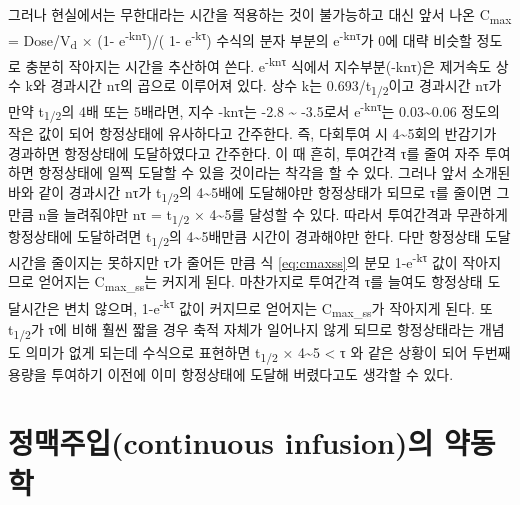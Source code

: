 \documentclass[
  11pt,
  krantz2, a4paper, twoside]{krantz}
\theoremstyle{definition}
\theoremstyle{definition}
\theoremstyle{definition}
\theoremstyle{definition}
\theoremstyle{remark}
\begin{document}
그러나 현실에서는 무한대라는 시간을 적용하는 것이 불가능하고 대신 앞서 나온 C\textsubscript{max} = Dose/V\textsubscript{d} × (1- e\textsuperscript{-knτ})/( 1- e\textsuperscript{-kτ}) 수식의 분자 부분의 e\textsuperscript{-knτ}가 0에 대략 비슷할 정도로 충분히 작아지는 시간을 추산하여 쓴다.
e\textsuperscript{-knτ} 식에서 지수부분(-knτ)은 제거속도 상수 k와 경과시간 nτ의 곱으로 이루어져 있다.
상수 k는 0.693/t\textsubscript{1/2}이고 경과시간 nτ가 만약 t\textsubscript{1/2}의 4배 또는 5배라면, 지수 -knτ는 -2.8 \textasciitilde{} -3.5로서 e\textsuperscript{-knτ}는 0.03\textasciitilde0.06 정도의 작은 값이 되어 항정상태에 유사하다고 간주한다. 
즉, 다회투여 시 4\textasciitilde5회의 반감기가 경과하면 항정상태에 도달하였다고 간주한다. 
이 때 흔히, 투여간격 τ를 줄여 자주 투여하면 항정상태에 일찍 도달할 수 있을 것이라는 착각을 할 수 있다. 
그러나 앞서 소개된 바와 같이 경과시간 nτ가 t\textsubscript{1/2}의 4\textasciitilde5배에 도달해야만 항정상태가 되므로 τ를 줄이면 그만큼 n을 늘려줘야만 nτ = t\textsubscript{1/2} × 4\textasciitilde5를 달성할 수 있다. 따라서 투여간격과 무관하게 항정상태에 도달하려면 t\textsubscript{1/2}의 4\textasciitilde5배만큼 시간이 경과해야만 한다. 
다만 항정상태 도달시간을 줄이지는 못하지만 τ가 줄어든 만큼 식 \eqref{eq:cmaxss}의 분모 1-e\textsuperscript{-kτ} 값이 작아지므로 얻어지는 C\textsubscript{max\_ss}는 커지게 된다. 
마찬가지로 투여간격 τ를 늘여도 항정상태 도달시간은 변치 않으며, 1-e\textsuperscript{-kτ} 값이 커지므로 얻어지는 C\textsubscript{max\_ss}가 작아지게 된다. 
또 t\textsubscript{1/2}가 τ에 비해 훨씬 짧을 경우 축적 자체가 일어나지 않게 되므로 항정상태라는 개념도 의미가 없게 되는데 수식으로 표현하면 t\textsubscript{1/2} × 4\textasciitilde5 \textless{} τ 와 같은 상황이 되어 두번째 용량을 투여하기 이전에 이미 항정상태에 도달해 버렸다고도 생각할 수 있다.

\hypertarget{uxc815uxb9e5uxc8fcuxc785continuous-infusionuxc758-uxc57duxb3d9uxd559}{%
\section{\texorpdfstring{정맥주입(continuous infusion)의 약동학}{정맥주입(continuous infusion)의 약동학}}\label{uxc815uxb9e5uxc8fcuxc785continuous-infusionuxc758-uxc57duxb3d9uxd559}}
\end{document}
